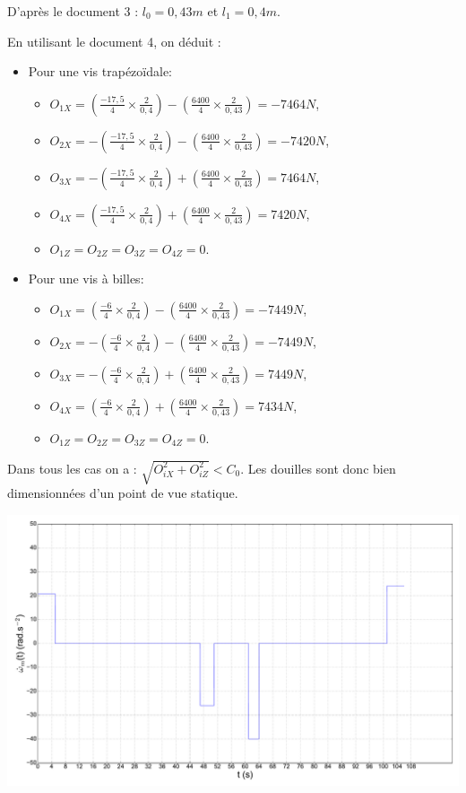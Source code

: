 
D'après le document 3 : $l_0=0,43m$ et $l_1=0,4m$.

En utilisant le document 4, on déduit :
\begin{itemize}
 \item Pour une vis trapézoïdale:
 \begin{itemize}
  \item $O_{1X}=\left(\frac{-17,5}{4}\times\frac{2}{0,4}\right)-\left(\frac{6400}{4}\times\frac{2}{0,43}\right)=-7464N$,
  \item $O_{2X}=-\left(\frac{-17,5}{4}\times\frac{2}{0,4}\right)-\left(\frac{6400}{4}\times\frac{2}{0,43}\right)=-7420N$,
  \item $O_{3X}=-\left(\frac{-17,5}{4}\times\frac{2}{0,4}\right)+\left(\frac{6400}{4}\times\frac{2}{0,43}\right)=7464N$,
  \item $O_{4X}=\left(\frac{-17,5}{4}\times\frac{2}{0,4}\right)+\left(\frac{6400}{4}\times\frac{2}{0,43}\right)=7420N$,
  \item $O_{1Z}=O_{2Z}=O_{3Z}=O_{4Z}=0$.
 \end{itemize}
 \item Pour une vis à billes:
 \begin{itemize}
  \item $O_{1X}=\left(\frac{-6}{4}\times\frac{2}{0,4}\right)-\left(\frac{6400}{4}\times\frac{2}{0,43}\right)=-7449N$,
  \item $O_{2X}=-\left(\frac{-6}{4}\times\frac{2}{0,4}\right)-\left(\frac{6400}{4}\times\frac{2}{0,43}\right)=-7449N$,
  \item $O_{3X}=-\left(\frac{-6}{4}\times\frac{2}{0,4}\right)+\left(\frac{6400}{4}\times\frac{2}{0,43}\right)=7449N$,
  \item $O_{4X}=\left(\frac{-6}{4}\times\frac{2}{0,4}\right)+\left(\frac{6400}{4}\times\frac{2}{0,43}\right)=7434N$,
  \item $O_{1Z}=O_{2Z}=O_{3Z}=O_{4Z}=0$.
 \end{itemize}
\end{itemize}

Dans tous les cas on a : $\sqrt{O_{iX}^2+O_{iZ}^2}<C_0$. Les douilles sont donc bien dimensionnées d'un point de vue statique.


\begin{center}
 \includegraphics[width=0.9\linewidth]{img/accel_cor}
\end{center}

